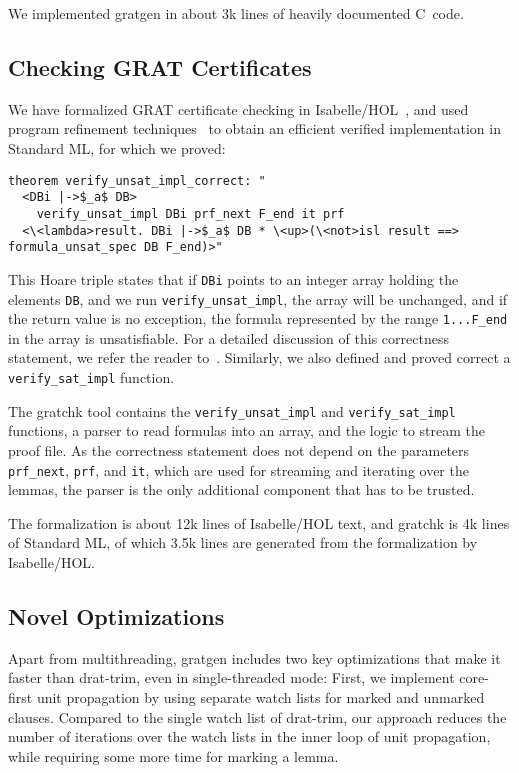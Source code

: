 \documentclass{llncs}
\newcommand{\isai}{\lstinline[language=isabelle,basicstyle=\normalsize\ttfamily\slshape]}
\newcommand\CC{C\nolinebreak[4]\hspace{-.05em}\raisebox{.4ex}{\relsize{-3}{\textbf{++}}}}
\begin{document}
We implemented gratgen in about 3k lines of heavily documented \CC~code.


\subsection{Checking GRAT Certificates}
We have formalized GRAT certificate checking in Isabelle/HOL~\cite{NPW02}, and used program refinement techniques~\cite{LaTu12,La15} to obtain an efficient verified implementation in Standard ML, 
for which we proved:
\begin{lstlisting}[language=isabelle]
theorem verify_unsat_impl_correct: "
  <DBi |->$_a$ DB> 
    verify_unsat_impl DBi prf_next F_end it prf
  <\<lambda>result. DBi |->$_a$ DB * \<up>(\<not>isl result ==> formula_unsat_spec DB F_end)>"
\end{lstlisting}
This Hoare triple states that if \isai$DBi$ points to an integer array holding the elements \isai$DB$,
and we run \isai$verify_unsat_impl$, the array will be unchanged, and if the return value is no exception,
the formula represented by the range \isai$1...F_end$ in the array is unsatisfiable. 
For a detailed discussion of this correctness statement, we refer the reader to~\cite{GRATchk-proof-outline,La17_CADE}.
Similarly, we also defined and proved correct a \isai{verify_sat_impl} function.

The gratchk tool contains the \isai{verify_unsat_impl} and \isai{verify_sat_impl} functions, a parser to read formulas into an array, and the logic to stream the proof file.
As the correctness statement does not depend on the parameters \isai{prf_next}, \isai{prf}, and \isai{it}, which are used for streaming and iterating over the lemmas,
the parser is the only additional component that has to be trusted. 

The formalization is about 12k lines of Isabelle/HOL text, and gratchk is 4k lines of Standard ML, of which 3.5k lines are generated from the formalization by Isabelle/HOL.


\subsection{Novel Optimizations}
Apart from multithreading, gratgen includes two key optimizations that make it faster than drat-trim, even in single-threaded mode:
First, we implement core-first unit propagation by using separate watch lists for marked and unmarked clauses. 
Compared to the single watch list of drat-trim, our approach reduces the number of iterations over the watch lists in the inner loop of unit 
propagation, while requiring some more time for marking a lemma.
\end{document}
